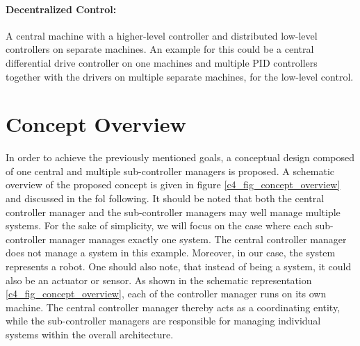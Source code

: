 \paragraph{Decentralized Control:}
A central machine with a higher-level controller and distributed low-level controllers on separate machines. An example for this could be a central differential drive controller on one machines and multiple PID controllers together with the drivers on multiple separate machines, for the low-level control. 


\section{Concept Overview}
In order to achieve the previously mentioned goals, a conceptual design composed of one central and multiple sub-controller managers is proposed. A schematic overview of the proposed concept is given in figure \ref{c4_fig_concept_overview} and discussed in the fol following. It should be noted that both the central controller manager and the sub-controller managers may well manage multiple systems. For the sake of simplicity, we will focus on the case where each sub-controller manager manages exactly one system. The central controller manager does not manage a system in this example. Moreover, in our case, the system represents a robot. One should also note, that instead of being a system, it could also be an actuator or sensor.\newline
As shown in the schematic representation \ref{c4_fig_concept_overview}, each of the controller manager runs on its own machine. The central controller manager thereby acts as a coordinating entity, while the sub-controller managers are responsible for managing individual systems within the overall architecture.\newline
